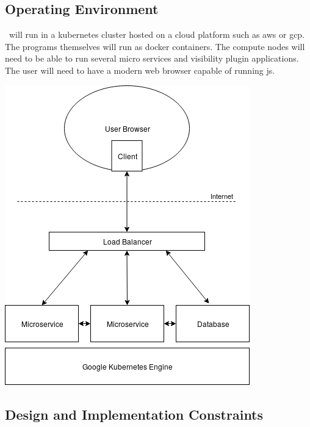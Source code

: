     \subsection{Operating Environment}\label{sec:operating-environment}
        \projectName\ will run in a \gls{kubernetes} cluster hosted on a cloud platform such as \gls{aws} or \gls{gcp}. The programs themselves will run as \gls{docker} containers. The compute nodes will need to be able to run several micro services and visibility plugin applications. The user will need to have a modern web browser capable of running \gls{js}. 
        \begin{center}
            \includegraphics[width=.7\textwidth]{images/Operating-Environment.png}
        \end{center}
    \subsection{Design and Implementation Constraints}\label{sec:design-constraints}
